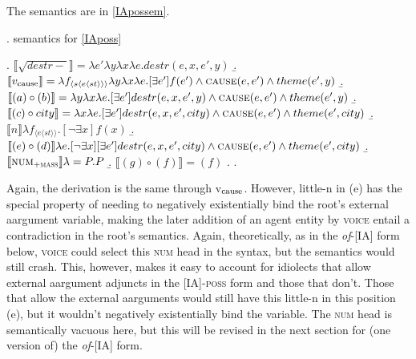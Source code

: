 \documentclass[12pt]{article}
\newcommand*{\textsub}[1]{\ensuremath{_\textrm{{\scriptsize #1}}}}
\begin{document}
The semantics are in \ref{IApossem}.

\singlespacing

\ex. \label{IApossem} semantics for \ref{IAposs}

\a. \begin{math}\llbracket\sqrt{destr-}\rrbracket = \lambda e' \lambda y \lambda x \lambda e . destr(e,x,e',y)\end{math}
\b. \begin{math}\llbracket v\textsub{cause}\rrbracket = \lambda f_{\langle s\langle e \langle st \rangle \rangle \rangle} \lambda y \lambda x \lambda e . [\exists e']f(e') \land \textsc{cause}(e,e') \land theme(e',y)\end{math}
\b. \begin{math}\llbracket (a) \circ (b) \rrbracket = \lambda y \lambda x \lambda e . [\exists e'] destr(e,x,e',y) \land \textsc{cause}(e,e') \land theme(e',y) \end{math}
\b. \begin{math}\llbracket (c) \circ city\rrbracket = \lambda x \lambda e . [\exists e'] destr(e,x,e',city) \land \textsc{cause}(e,e') \land theme(e',city) \end{math}
\b. \begin{math} \llbracket n \rrbracket\lambda f_{\langle e \langle st \rangle \rangle} . [\neg\exists x]f(x) \end{math}
\b. \begin{math}\llbracket (e) \circ (d) \rrbracket\lambda e . [\neg\exists x][\exists e'] destr(e,x,e',city) \land \textsc{cause}(e,e') \land theme(e',city) \end{math}
\b. \begin{math} \llbracket \textsc{num}\textsub{\textsc{+mass}} \rrbracket \lambda = P.P \end{math}
\b. \begin{math}\llbracket (g) \circ (f) \rrbracket = (f)\end{math}
\z. \z. \par

\doublespacing

\noindent Again, the derivation is the same through v\textsub{cause}. However, little-n in (e) has the special property of needing to negatively existentially bind the root's external aargument variable, making the later addition of an agent entity by \textsc{voice} entail a contradiction in the root's semantics. Again, theoretically, as in the \textit{of}-[IA] form below, \textsc{voice} could select this \textsc{num} head in the syntax, but the semantics would still crash. This, however, makes it easy to account for idiolects that allow external aargument adjuncts in the [IA]-\textsc{poss} form and those that don't. Those that allow the external aarguments would still have this little-n in this position (e), but it wouldn't negatively existentially bind the variable. The \textsc{num} head is semantically vacuous here, but this will be revised in the next section for (one version of) the \textit{of}-[IA] form.
\end{document}
